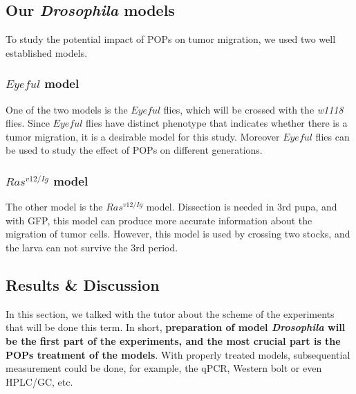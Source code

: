 \subsection{Our \textit{Drosophila} models}
To study the potential impact of POPs on tumor migration, we used two well established models.

\subsubsection{$Eyeful$ model}
One of the two models is the $Eyeful$ flies\cite{ferres2006epigenetic}, which will be crossed with the \textit{w1118} flies. 
Since $Eyeful$  flies have distinct phenotype that indicates whether there is a tumor migration, 
it is a desirable model for this study. 
Moreover $Eyeful$ flies can be used to study the effect of POPs on different generations.


\subsubsection{$Ras^{v12/Ig}$ model}
The other model is the $Ras^{v12/Ig}$ model. Dissection is needed in 3rd pupa,
and with GFP, this model can produce more accurate information about the migration of tumor cells.
However, this model is used by crossing two stocks, and the larva can not survive the 3rd period.

\subsection{Results \& Discussion}

In this section, we talked with the tutor about the scheme of the experiments that will be done this term. In short, \textbf{preparation of model \textit{Drosophila} will be the first part of the experiments, and the most crucial part is the POPs treatment of the models}. With properly treated models, subsequential measurement could be done, for example, the qPCR, Western bolt or even HPLC/GC, etc.